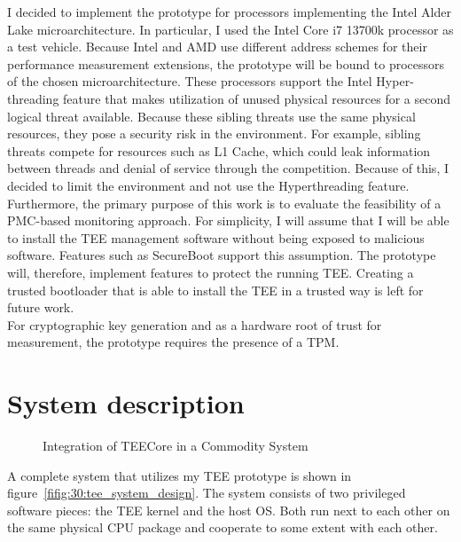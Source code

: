 I decided to implement the prototype for processors implementing the Intel Alder
Lake microarchitecture. In particular, I used the Intel Core i7 13700k processor
as a test vehicle. Because Intel and AMD use different address schemes for their
performance measurement extensions, the prototype will be bound to processors of
the chosen microarchitecture. These processors support the Intel Hyper-threading
feature that makes utilization of unused physical resources for a second logical
threat available. Because these sibling threats use the same physical resources,
they pose a security risk in the environment. For example,  sibling threats
compete for resources such as L1 Cache, which could leak information
between threads and denial of service through the competition.
Because of this, I decided to limit the environment and not use the
Hyperthreading feature.\\

Furthermore, the primary purpose of this work is to evaluate the feasibility of
a PMC-based monitoring approach. For simplicity, I will assume that I will be
able to install the TEE management software without being exposed to malicious
software. Features such as SecureBoot support this assumption. The
prototype will, therefore, implement features to protect the running TEE.
Creating a trusted bootloader that is able to install the TEE in a trusted way
is left for future work.\\

For cryptographic key generation and as a hardware root of trust for
measurement, the prototype requires the presence of a TPM.


\section{System description}
\label{sec:30:system_description}

\begin{figure}
    \begin{center}
        
        \caption{Integration of TEECore in a Commodity System}
        \label{fig:30:tee_system_design}
    \end{center}
\end{figure}

A complete system that utilizes my TEE prototype is shown in
figure~\ref{fifig:30:tee_system_design}. The system consists of two privileged
software pieces: the TEE kernel and the host OS. Both run next to each other on
the same physical CPU package and cooperate to some extent with each other.\\

